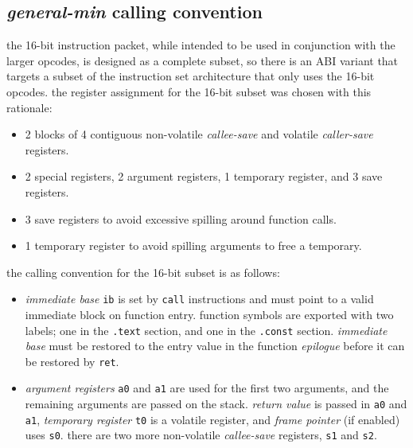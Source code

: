 \newpage
\subsection{\emph{general-min} calling convention}
\label{sec:calling-convention-general-min}

the 16-bit instruction packet, while intended to be used in conjunction
with the larger opcodes, is designed as a complete subset, so there is
an ABI variant that targets a subset of the instruction set architecture
that only uses the 16-bit opcodes.
\para
the register assignment for the 16-bit subset was chosen with this rationale:

\begin{itemize}[itemsep=0pt]
\item  2 blocks of 4 contiguous non-volatile \emph{callee-save} and volatile
\emph{caller-save} registers.
\item  2 special registers, 2 argument registers, 1 temporary register,
and 3 save registers.
\item  3 save registers to avoid excessive spilling around function calls.
\item  1 temporary register to avoid spilling arguments to free a temporary.
\end{itemize}

\par\noindent
the calling convention for the 16-bit subset is as follows:

\begin{itemize}[itemsep=0pt]
\item \emph{immediate base} \texttt{ib} is set by \texttt{call} instructions
and must point to a valid immediate block on function entry. function
symbols are exported with two labels; one in the \texttt{.text} section, and
one in the \texttt{.const} section. \emph{immediate base} must be restored
to the entry value in the function \emph{epilogue} before it can be restored
by \texttt{ret}.
\item \emph{argument registers} \texttt{a0} and \texttt{a1} are used for the
first two arguments, and the remaining arguments are passed on the stack.
\emph{return value} is passed in \texttt{a0} and \texttt{a1},
\emph{temporary register} \texttt{t0} is a volatile register, and
\emph{frame pointer} (if enabled) uses \texttt{s0}. there are two more
non-volatile \emph{callee-save} registers, \texttt{s1} and \texttt{s2}.
\end{itemize}

